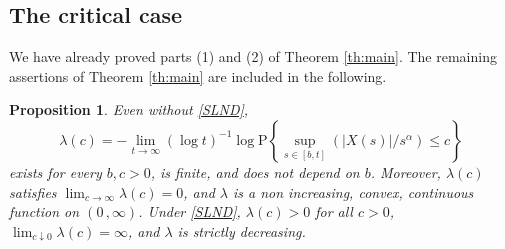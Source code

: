 \documentclass[reqno]{amsart}
\newcommand{\<}{\langle}
\renewcommand{\>}{\rangle}
\renewcommand{\P}{\mathrm{P}}
\newcommand{\1}{\mathbb{1}}
\renewcommand{\le}{\leqslant}
\newtheorem{proposition}[stat]{Proposition}
\theoremstyle{definition}
\numberwithin{equation}{section}
\begin{document}
 \subsection{The critical case} 
 We have already proved parts (1) and (2) of Theorem
 \ref{th:main}. The remaining assertions of Theorem \ref{th:main}
 are included in the following.

\begin{proposition}\label{pr:X}
	Even without  \eqref{SLND},
	\[\textstyle
		\lambda(c) = -\lim\limits_{t\to\infty} (\log t)^{-1}\log
		\P\left\{{ \sup_{s\in[b,t]} ( |X(s)|/s^\alpha)} \le c\right\}
	\]
	exists for every $b,c>0$, is finite, and does not depend on $b$. 
	Moreover, $\lambda(c)$ satisfies $\lim_{c\to\infty} \lambda(c)=0$, and $\lambda$ is a 
	non increasing, convex, continuous function on $(0\,,\infty)$.
	Under \eqref{SLND}, $\lambda(c)>0$
	for all $c>0$, $\lim_{c\downarrow0} \lambda(c)=\infty$, and $\lambda$ is strictly decreasing.
\end{proposition}
\end{document}
